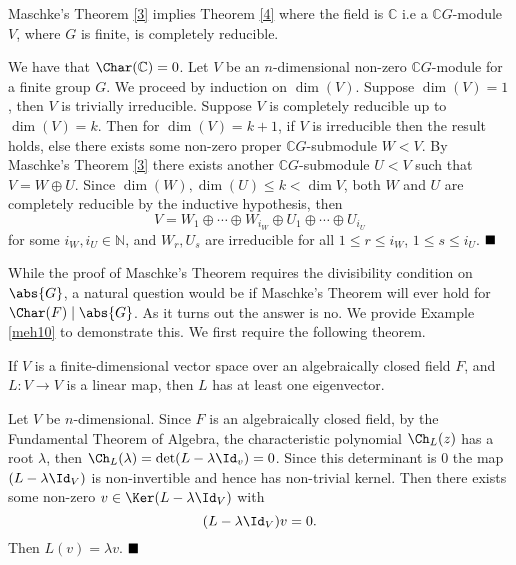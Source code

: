 \documentclass[../Project.tex]{subfiles}
\begin{document}
\begin{prop}[{\cite[Theorem 8.7]{2}}]
	\label{maschkecompred}
	Maschke's Theorem \ref{3} implies Theorem \ref{4} where the field is $\mathbb{C}$ i.e a $\mathbb{C}G$-module $V$, where $G$ is finite, is completely reducible.
\end{prop}

\begin{proo*}[{\cite[Theorem 8.7]{2}}]
	We have that $\Char(\mathbb{C}) = 0$. Let $V$ be an $n$-dimensional non-zero $\mathbb{C}G$-module for a finite group $G$. We proceed by induction on $\dim(V)$. Suppose $\dim(V) = 1$, then $V$ is trivially irreducible. Suppose $V$ is completely reducible up to $\dim(V) = k$. Then for $\dim(V) = k+1$, if $V$ is irreducible then the result holds, else there exists some non-zero proper $\mathbb{C}G$-submodule $W < V$. By Maschke's Theorem \ref{3} there exists another $\mathbb{C}G$-submodule $U < V$ such that $V = W \oplus U$. Since $\dim(W), \dim(U) \leqslant k < \dim V$, both $W$ and $U$ are completely reducible by the inductive hypothesis, then
	$$V = W_1 \oplus \cdots \oplus W_{i_W} \oplus U_1 \oplus \cdots \oplus U_{i_U}$$
	for some $i_W,i_U \in \mathbb{N}$, and $W_r,U_s$ are irreducible for all $1 \leqslant r \leqslant i_W$, $1 \leqslant s \leqslant i_U$. $\hfill \blacksquare$
\end{proo*}

While the proof of Maschke's Theorem requires the divisibility condition on $\abs{G}$, a  natural question would be if Maschke's Theorem will ever hold for $\Char(F) \mid \abs{G}$. As it turns out the answer is no. We provide Example \ref{meh10} to demonstrate this. We first require the following theorem.
\begin{theo}
	If $V$ is a finite-dimensional vector space over an algebraically closed field $F$, and $L : V \to V$ is a linear map, then $L$ has at least one eigenvector.
	\label{eigenvectheo}
\end{theo}
\begin{proo*}
	Let $V$ be $n$-dimensional. Since $F$ is an algebraically closed field, by the Fundamental Theorem of Algebra, the characteristic polynomial $\Ch_L(z)$ has a root $\lambda$, then $\Ch_L(\lambda) = \det(L - \lambda\Id_v) = 0$. Since this determinant is $0$ the map $(L - \lambda\Id_V)$ is non-invertible and hence has non-trivial kernel. Then there exists some non-zero $v \in \Ker(L - \lambda\Id_V)$ with
	$$(L - \lambda\Id_V)v = 0.$$
	Then $L(v) = \lambda v$. $\hfill\blacksquare$
\end{proo*}
\end{document}
